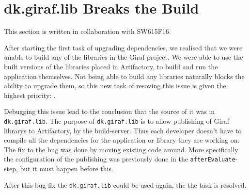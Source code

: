 \section{dk.giraf.lib Breaks the Build}
This section is written in collaboration with SW615F16.

After starting the first task of upgrading dependencies, we realised that we were unable to build any of the libraries in the Giraf project. 
We were able to use the built versions of the libraries placed in Artifactory, to build and run the application themselves. 
Not being able to build any libraries naturally blocks the ability to upgrade them, so this new task of resoving this issue is given the highest priority: \pblocking. 

Debugging this issue lead to the conclusion that the source of it was in \texttt{dk.giraf.lib}.
The purpose of \texttt{dk.giraf.lib} is to allow publishing of Giraf librarys to Artifactory, by the build-server.
Thus each developer doesn't have to compile all the dependencies for the application or library they are working on. 
The fix to the bug was done by moving existing code around. 
More specifically the configuration of the publishing was previously done in the \texttt{afterEvaluate}-step, but it must happen before this. 

After this bug-fix the \texttt{dk.giraf.lib} could be used again, the the task is resolved. 